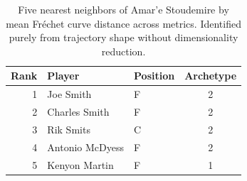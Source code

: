 \begin{table}[htbp]
  \centering\small
  \begin{tabular}{rllc}
    \toprule
    Rank & Player & Position & Archetype \\
    \midrule
    1 & Joe Smith & F & 2 \\
    2 & Charles Smith & F & 2 \\
    3 & Rik Smits & C & 2 \\
    4 & Antonio McDyess & F & 2 \\
    5 & Kenyon Martin & F & 1 \\
    \bottomrule
  \end{tabular}
  \caption{Five nearest neighbors of Amar'e Stoudemire by mean Fr\'{e}chet curve distance across metrics. Identified purely from trajectory shape without dimensionality reduction.}
  \label{tab:Amar_e_Stoudemire_frechet_curve_neighbors}
\end{table}

